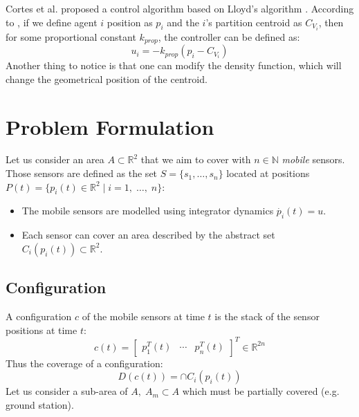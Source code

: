 \documentclass{iacas}
\newcommand{\rsqr}{\mathbb{R}^2}
\newcommand{\bmat}[1]{\begin{bmatrix}#1\end{bmatrix}}
\begin{document}
Cortes et al. proposed a control algorithm based on Lloyd's algorithm \cite{Cortes2004}. According to \cite{Cortes2004}, if we define agent $i$ position as $p_i$ and the $i$'s partition centroid as $C_{V_{i}}$, then for some proportional constant $k_{prop}$, the controller can be defined as:
\begin{equation} \label{LloydsContol}
u_{i} = -k_{prop}\left( p_i - C_{V_{i}} \right)
\end{equation} 
%
Another thing to notice is that one can modify the density function, which will change the geometrical position of the centroid.


\section{Problem Formulation}
Let us consider an area $A \subset \rsqr$ that we aim to cover with $n \in \mathbb{N}$ \emph{mobile} sensors. Those sensors are defined as the set $S = \{s_1, \ldots, s_n\}$ located at positions $P(t) = \{ p_i (t) \in \rsqr \mid i = 1,\; \ldots ,\; n\}$:
\begin{itemize}
\item The mobile sensors are modelled using integrator dynamics $\dot{p_i}(t)=u$.
\item Each sensor can cover an area described by the abstract set $C_i \left( p_i(t) \right) \subset \rsqr$.
\end{itemize}

\subsection{Configuration}
A configuration $c$ of the mobile sensors at time $t$ is the stack of the sensor positions at time $t$:
\begin{equation*}
c\left(t\right) = \bmat{
p_{1}^{T}\left(t\right)&\cdots&p_{n}^{T}\left(t\right)}^{T}\in\mathbb{R}^{2n}
\end{equation*}
Thus the coverage of a configuration:
\begin{equation*}
D\left( c\left( t \right) \right) = \cap C_i(p_i(t))
\end{equation*}
Let us consider a sub-area of $A,\; A_m \subset A$ which must be partially covered (e.g. ground station).
\end{document}
